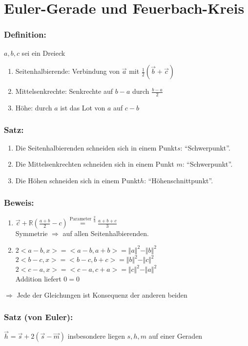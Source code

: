 \section{Euler-Gerade und Feuerbach-Kreis}
%
%
%
\subsubsection{Definition:}
$a,b,c$ sei ein Dreieck
\begin{enumerate}
	\item Seitenhalbierende: Verbindung von $\vec{a}$ mit $\frac{1}{2}(\vec{b}+\vec{c})$
	\item Mittelsenkrechte: Senkrechte auf $b-a$ durch $\frac{b-a}{2}$
	\item Höhe: durch $a$ ist das Lot von $a$ auf $c-b$
\end{enumerate}
%
%
%
\subsubsection{Satz:}
\begin{enumerate}
	\item Die Seitenhalbierenden schneiden sich in einem Punkt$s$: "`Schwerpunkt"'.
	\item Die Mittelsenkrechten schneiden sich in einem Punkt $m$: "`Schwerpunkt"'.
	\item Die Höhen schneiden sich in einem Punkt$h$: "`Höhenschnittpunkt"'.
\end{enumerate}
%
%
%
\subsubsection{Beweis:}
\begin{enumerate}
	\item $\vec{c}+\mathbb{R}(\frac{a+b}{2}-c)\mathop{=}\limits^{\textrm{Parameter 
	}\frac{2}{3}}\frac{a+b+c}{3}$\\
	Symmetrie $\Rightarrow$ auf allen Seitenhalbierenden.
	\item $2<a-b,x>=<a-b,a+b>=\Vert a\Vert^{2}-\Vert b\Vert^{2}$\\
	$2<b-c,x>=<b-c,b+c>=\Vert b \Vert^{2}-\Vert c \Vert^{2}$\\
	$2<c-a,x>=<c-a,c+a>=\Vert c \Vert^{2}-\Vert a\Vert^{2}$\\
	Addition liefert $0=0$
\end{enumerate}
$\Rightarrow$ Jede der Gleichungen ist Konsequenz der anderen beiden
%
%
%
\subsubsection{Satz (von Euler):}
$\vec{h}=\vec{s}+2(\vec{s}-\vec{m})$ insbesondere liegen $s,h,m$ auf einer Geraden
%
%
%
